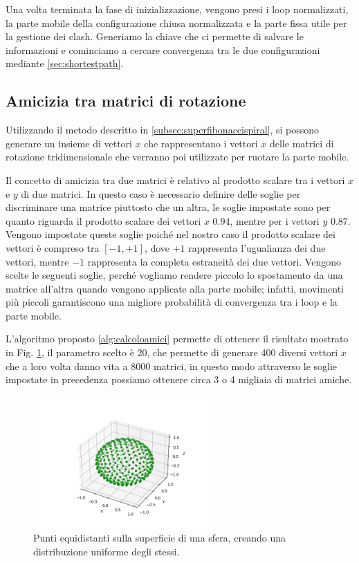 Una volta terminata la fase di inizializzazione, vengono presi i loop normalizzati, la parte mobile della configurazione chiusa normalizzata e la parte fissa utile per la gestione dei clash. Generiamo la chiave che ci permette di salvare le informazioni e cominciamo a cercare convergenza tra le due configurazioni mediante \ref{sec:shortestpath}.

\subsection{Amicizia tra matrici di rotazione}\label{subsec:amiciziarotazioni}

Utilizzando il metodo descritto in \ref{subsec:superfibonaccispiral}, si possono generare un insieme di vettori $x$ che rappresentano i vettori $x$ delle matrici di rotazione tridimensionale che verranno poi utilizzate per ruotare la parte mobile. 

Il concetto di amicizia tra due matrici è relativo al prodotto scalare tra i vettori $x$ e $y$ di due matrici. In questo caso è necessario definire delle soglie per discriminare una matrice piuttosto che un altra, le soglie impostate sono per quanto riguarda il prodotto scalare dei vettori $x$ $0.94$, mentre per i vettori $y$ $0.87$. Vengono impostate queste soglie poiché nel nostro caso il prodotto scalare dei vettori è compreso tra $[-1, +1]$, dove $+1$ rappresenta l'ugualianza dei due vettori, mentre $-1$ rappresenta la completa estraneità dei due vettori. 
Vengono scelte le seguenti soglie, perché vogliamo rendere piccolo lo spostamento da una matrice all'altra quando vengono applicate alla parte mobile; infatti, movimenti più piccoli garantiscono una migliore probabilità di convergenza tra i loop e la parte mobile. 

L'algoritmo proposto \ref{alg:calcoloamici} permette di ottenere il risultato mostrato in Fig. \ref{fig:Tagliox}, il parametro scelto è 20, che permette di generare 400 diversi vettori $x$ che a loro volta danno vita a 8000 matrici, in questo modo attraverso le soglie impostate in precedenza possiamo ottenere circa 3 o 4 migliaia di matrici amiche. 

\begin{figure}[H]
	\centering
	\includegraphics[width=0.6\textwidth]{Immagini/Tagliox.png}
	\caption{Punti equidistanti sulla superficie di una sfera, creando una distribuzione uniforme degli stessi.}
	\label{fig:Tagliox}
\end{figure}

